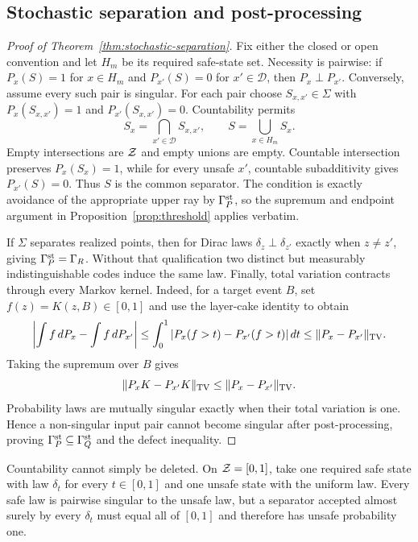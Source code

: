 \subsection{Stochastic separation and post-processing}

\begin{proof}[Proof of Theorem~\ref{thm:stochastic-separation}]
Fix either the closed or open convention and let $H_m$ be its required safe-state set.  Necessity
is pairwise: if $P_x(S)=1$ for $x\in H_m$ and $P_{x'}(S)=0$ for $x'\in\mathcal D$, then
$P_x\perp P_{x'}$.  Conversely, assume every such pair is singular.  For each pair choose
$S_{x,x'}\in\Sigma$ with $P_x(S_{x,x'})=1$ and $P_{x'}(S_{x,x'})=0$.  Countability permits
\[
 S_x=\bigcap_{x'\in\mathcal D}S_{x,x'},\qquad
 S=\bigcup_{x\in H_m}S_x.
\]
Empty intersections are $\mathcal{Z}$ and empty unions are empty.  Countable intersection preserves
$P_x(S_x)=1$, while for every unsafe $x'$, countable subadditivity gives $P_{x'}(S)=0$.
Thus $S$ is the common separator.  The condition is exactly avoidance of the appropriate upper
ray by $\Gamma_P^{\rm st}$, so the supremum and endpoint argument in
Proposition~\ref{prop:threshold} applies verbatim.

If $\Sigma$ separates realized points, then for Dirac laws $\delta_z\perp\delta_{z'}$ exactly when
$z\neq z'$, giving $\Gamma_P^{\rm st}=\Gamma_R$.  Without that qualification two distinct but
measurably indistinguishable codes induce the same law.  Finally, total variation contracts through
every Markov kernel.  Indeed, for a target event $B$, set $f(z)=K(z,B)\in[0,1]$ and use the
layer-cake identity to obtain
\[
 \left|\int f\,dP_x-\int f\,dP_{x'}\right|
 \leq\int_0^1|P_x(f>t)-P_{x'}(f>t)|\,dt
 \leq\|P_x-P_{x'}\|_{\rm TV}.
\]
Taking the supremum over $B$ gives
\[
 \|P_xK-P_{x'}K\|_{\rm TV}\leq\|P_x-P_{x'}\|_{\rm TV}.
\]
Probability laws are mutually singular exactly when their total variation is one.  Hence a
non-singular input pair cannot become singular after post-processing, proving
$\Gamma_P^{\rm st}\subseteq\Gamma_Q^{\rm st}$ and the defect inequality.
\end{proof}

Countability cannot simply be deleted.  On $\mathcal{Z}=[0,1]$, take one required safe state with law
$\delta_t$ for every $t\in[0,1]$ and one unsafe state with the uniform law.  Every safe law is
pairwise singular to the unsafe law, but a separator accepted almost surely by every $\delta_t$
must equal all of $[0,1]$ and therefore has unsafe probability one.

